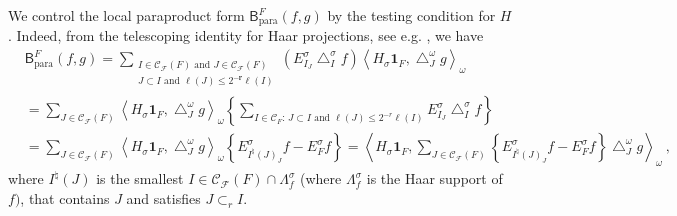 \documentclass{amsart}%
\theoremstyle{plain}
\numberwithin{equation}{section}
\begin{document}
We control the local paraproduct form $\mathsf{B}_{\operatorname*{para}}%
^{F}\left(  f,g\right)  $ by the testing condition for $H$. Indeed, from the
telescoping identity for Haar projections, see e.g. \cite{LaSaUr2}, we have%
\begin{align*}
& \mathsf{B}_{\operatorname*{para}}^{F}\left(  f,g\right)  =\sum
_{\substack{I\in\mathcal{C}_{\mathcal{F}}\left(  F\right)  \text{ and }%
J\in\mathcal{C}_{\mathcal{F}}\left(  F\right)  \\J\subset I\text{ and }%
\ell\left(  J\right)  \leq2^{-\mathbf{r}}\ell\left(  I\right)  }}\left(
E_{I_{J}}^{\sigma}\bigtriangleup_{I}^{\sigma}f\right)  \left\langle H_{\sigma
}\mathbf{1}_{F},\bigtriangleup_{J}^{\omega}g\right\rangle _{\omega}\\
& =\sum_{J\in\mathcal{C}_{\mathcal{F}}\left(  F\right)  }\left\langle
H_{\sigma}\mathbf{1}_{F},\bigtriangleup_{J}^{\omega}g\right\rangle _{\omega
}\left\{  \sum_{I\in\mathcal{C}_{F}\text{:\ }J\subset I\text{ and }\ell\left(
J\right)  \leq2^{-r}\ell\left(  I\right)  }E_{I_{J}}^{\sigma}\bigtriangleup
_{I}^{\sigma}f\right\} \\
& =\sum_{J\in\mathcal{C}_{\mathcal{F}}\left(  F\right)  }\left\langle
H_{\sigma}\mathbf{1}_{F},\bigtriangleup_{J}^{\omega}g\right\rangle _{\omega
}\left\{  E_{I^{\natural}\left(  J\right)  _{J}}^{\sigma}f-E_{F}^{\sigma
}f\right\}  =\left\langle H_{\sigma}\mathbf{1}_{F},\sum_{J\in\mathcal{C}%
_{\mathcal{F}}\left(  F\right)  }\left\{  E_{I^{\natural}\left(  J\right)
_{J}}^{\sigma}f-E_{F}^{\sigma}f\right\}  \bigtriangleup_{J}^{\omega
}g\right\rangle _{\omega}\ ,
\end{align*}
where $I^{\natural}\left(  J\right)  $ is the smallest $I\in\mathcal{C}%
_{\mathcal{F}}\left(  F\right)  \cap\Lambda_{f}^{\sigma}$ (where $\Lambda
_{f}^{\sigma}$ is the Haar support of $f)$, that contains $J$ and satisfies
$J\subset_{r}I$.
\end{document}
